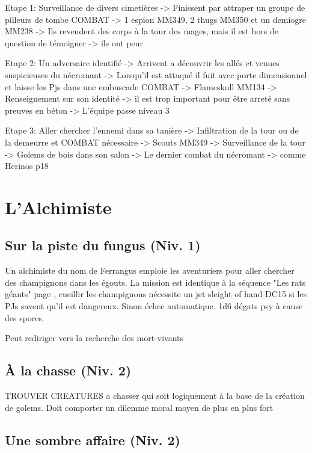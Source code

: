 Etape 1: Surveillance de divers cimetières
 -> Finissent par attraper un groupe de pilleurs de tombe COMBAT -> 1 espion MM349, 2 thugs MM350 et un demiogre MM238 
 -> Ils revendent des corps à la tour des mages, mais il est hors de question de témoigner -> ils ont peur

Etape 2: Un adversaire identifié
 -> Arrivent a découvrir les allés et venues suspicieuses du nécromant
 -> Lorsqu'il est attaqué il fuit avec porte dimensionnel et laisse les Pjs dans une embuscade COMBAT -> Flameskull MM134
 -> Renseignement sur son identité -> il est trop important pour être arreté sans preuves en béton
 -> L'équipe passe niveau 3

Etape 3: Aller chercher l'ennemi dans sa tanière
 -> Infiltration de la tour ou de la demeurre et COMBAT nécessaire -> Scouts MM349
 -> Surveillance de la tour
 -> Golems de bois dans son salon
 -> Le dernier combat du nécromant -> comme Herinos p18

\section{L'Alchimiste}

\subsection{Sur la piste du fungus (Niv. 1)}

Un alchimiste du nom de Ferrangus emploie les aventuriers pour aller chercher des champignons dans les
égouts. La mission est identique à la séquence "Les rats géants" page \pageref{ss:RatsGeants}, cueillir 
les champignons nécessite un jet sleight of hand DC15
si les PJs savent qu'il est dangereux. Sinon échec automatique. 1d6 dégats psy à cause des spores.

Peut rediriger vers la recherche des mort-vivants 

\subsection{À la chasse (Niv. 2)}

TROUVER CREATURES a chasser qui soit logiquement à la base de la création de golems. Doit comporter
un dilemme moral moyen de plus en plus fort

\subsection{Une sombre affaire (Niv. 2)}

